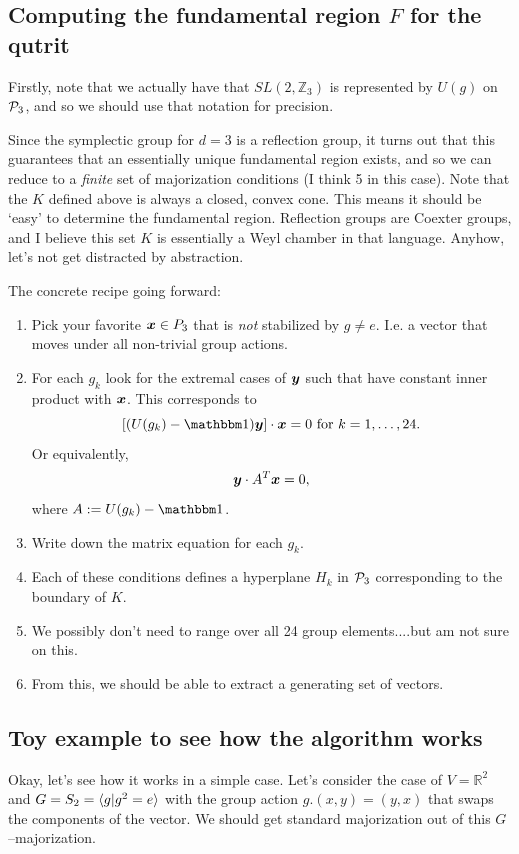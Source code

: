 \documentclass[pra,
aps,
twocolumn,
superscriptaddress,
groupedaddress,
nofootinbib,
reprint
]{revtex4-1}
\begin{document}
\subsection{Computing the fundamental region $F$ for the qutrit}
Firstly, note that we actually have that $SL(2, \mathbb{Z}_3)$ is represented by $U(g)$ on $\P_3$, and so we should use that notation for precision.

Since the symplectic group for $d=3$ is a reflection group, it turns out that this guarantees that an essentially unique fundamental region exists, and so we can reduce to a \emph{finite} set of majorization conditions (I think 5 in this case). Note that the $K$ defined above is always a closed, convex cone. This means it should be `easy' to determine the fundamental region. Reflection groups are Coexter groups, and I believe this set $K$ is essentially a Weyl chamber in that language. Anyhow, let's not get distracted by abstraction.


The concrete recipe going forward:
\begin{enumerate}
\item Pick your favorite $\x \in P_3$ that is \emph{not} stabilized by $g\ne e$. I.e. a vector that moves under all non-trivial group actions.
\item For each $g_k$ look for the extremal cases of $\y$ such that have constant inner product with $\x$. This corresponds to 
\begin{equation}
\left [ (U(g_k) -\I) \y \right ] \cdot \x = 0 \mbox{ for }k=1, \dots ,24.
\end{equation}
Or equivalently,
\begin{equation}
\y \cdot A^T\x = 0,
\end{equation}
where $A := U(g_k) -\I$.
\item Write down the matrix equation for each $g_k$.
\item Each of these conditions defines a hyperplane $H_k$ in $\P_3$ corresponding to the boundary of $K$.
\item We possibly don't need to range over all 24 group elements....but am not sure on this.
\item From this, we should be able to extract a generating set of vectors.
\end{enumerate}

\subsection{Toy example to see how the algorithm works}
Okay, let's see how it works in a simple case. Let's consider the case of $V= \mathbb{R}^2$ and $G=S_2=\<g|g^2=e\>$ with the group action $g.(x,y) = (y,x)$ that swaps the components of the vector. We should get standard majorization out of this $G$--majorization.
\end{document}
